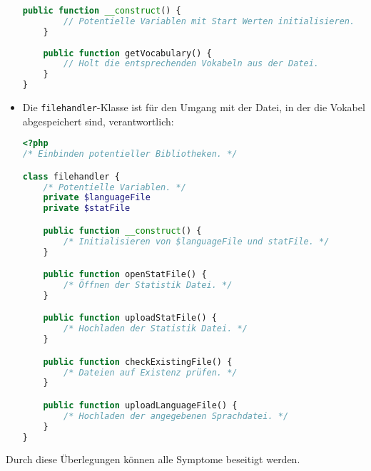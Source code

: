 \documentclass{scrartcl}
\begin{document}
\begin{itemize}
\begin{lstlisting}[language=php]
	public function __construct() {
		// Potentielle Variablen mit Start Werten initialisieren.
	}
	
	public function getVocabulary() {
		// Holt die entsprechenden Vokabeln aus der Datei.
	}
}
\end{lstlisting}
\item Die \lstinline`filehandler`-Klasse ist für den Umgang mit der Datei, in der die Vokabel abgespeichert sind, verantwortlich:
\begin{lstlisting}[language=php]
<?php
/* Einbinden potentieller Bibliotheken. */

class filehandler {
	/* Potentielle Variablen. */
	private $languageFile
	private $statFile

	public function __construct() {
		/* Initialisieren von $languageFile und statFile. */
	}

	public function openStatFile() {
		/* Öffnen der Statistik Datei. */
	}	

	public function uploadStatFile() {
		/* Hochladen der Statistik Datei. */
	}

	public function checkExistingFile() {
		/* Dateien auf Existenz prüfen. */
	}

	public function uploadLanguageFile() {
		/* Hochladen der angegebenen Sprachdatei. */
	}
}
\end{lstlisting}
\end{itemize}
Durch diese Überlegungen können alle Symptome beseitigt werden.
\end{document}
